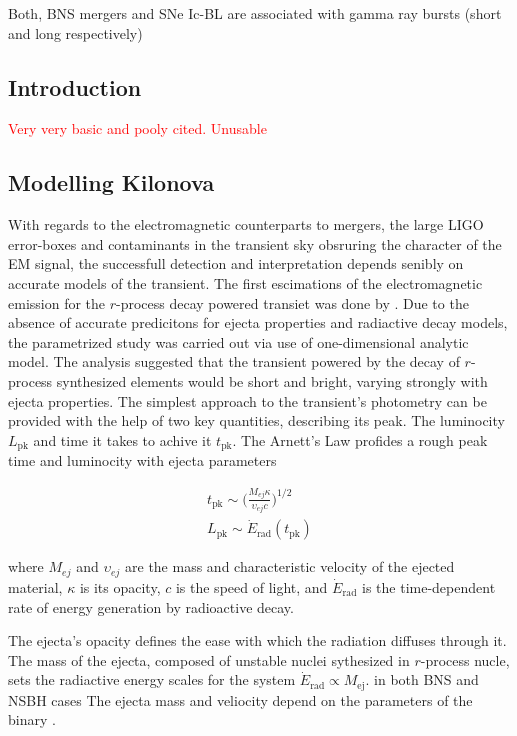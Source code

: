 \documentclass[11pt,a4paper,headinclude=true,DIV=14,BCOR=8mm,chapterprefix,listof=totoc,twoside,openright,abstracton]{scrbook}
\newcommand{\red}[1]{\textcolor{red}{#1}}
\begin{document}
Both, BNS mergers and SNe Ic-BL are associated with gamma ray bursts (short and long respectively)
\subsection{Introduction}
\red{Very very basic and pooly cited. Unusable}

\subsection{Modelling Kilonova}

With regards to the electromagnetic counterparts to mergers, the large LIGO error-boxes and contaminants in the transient sky obsruring the character of the EM signal, the successfull detection and interpretation depends senibly on accurate models of the transient. 
The first escimations of the electromagnetic emission for the $r$-process decay powered transiet was done by \cite{Li & Paczynski (1998)}. Due to the absence of accurate predicitons for ejecta properties and radiactive decay models, the parametrized study was carried out via use of one-dimensional analytic model. The analysis suggested that the transient powered by the decay of $r$-process synthesized elements would be short and bright, varying strongly with ejecta properties. 
The simplest approach to the transient's photometry can be provided with the help of two key quantities, describing its peak. The luminocity $L_{\text{pk}}$ and time it takes to achive it $t_{\text{pk}}$.
The Arnett's Law profides a rough peak time and luminocity with ejecta parameters

\begin{align}
    t_{\text{pk}} \sim \Bigg(\frac{M_{ej}\kappa}{\upsilon_{ej} c}\Bigg)^{1/2} \\
    L_{\text{pk}} \sim \dot{E}_{\text{rad}}(t_{\text{pk}})
\end{align}

where $M_{ej}$ and $\upsilon_{ej}$ are the mass and characteristic velocity of the ejected material, $\kappa$ is its opacity, $c$ is the speed of light, and $\dot{E}_{\text{rad}}$ is the time-dependent rate of energy generation by radioactive decay. 

The ejecta's opacity defines the ease with which the radiation diffuses through it. The mass of the ejecta, composed of unstable nuclei sythesized in $r$-process nucle, sets the radiactive energy scales for the system $\dot{E}_{\text{rad}}\propto M_{\text{ej}}$. in both BNS and NSBH cases
The ejecta mass and veliocity depend on the parameters of the binary \cite{(Oechslin et al. 2007; Sekiguchi et al. 2016; Kyutoku et al. 2015}.
\end{document}
